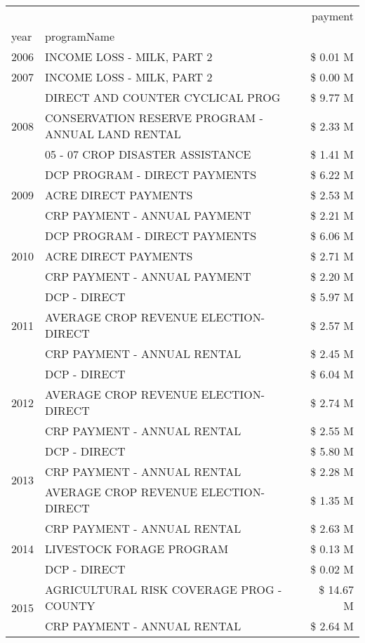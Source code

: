 \begin{tabular}{llr}
\toprule
 &  & payment \\
year & programName &  \\
\midrule
2006 & INCOME LOSS - MILK, PART 2 & \$ 0.01 M \\
\cline{1-3}
2007 & INCOME LOSS - MILK, PART 2 & \$ 0.00 M \\
\cline{1-3}
\multirow[t]{3}{*}{2008} & DIRECT AND COUNTER CYCLICAL PROG & \$ 9.77 M \\
 & CONSERVATION RESERVE PROGRAM - ANNUAL LAND RENTAL & \$ 2.33 M \\
 & 05 - 07 CROP DISASTER ASSISTANCE & \$ 1.41 M \\
\cline{1-3}
\multirow[t]{3}{*}{2009} & DCP PROGRAM - DIRECT PAYMENTS & \$ 6.22 M \\
 & ACRE DIRECT PAYMENTS & \$ 2.53 M \\
 & CRP PAYMENT - ANNUAL PAYMENT & \$ 2.21 M \\
\cline{1-3}
\multirow[t]{3}{*}{2010} & DCP PROGRAM - DIRECT PAYMENTS & \$ 6.06 M \\
 & ACRE DIRECT PAYMENTS & \$ 2.71 M \\
 & CRP PAYMENT - ANNUAL PAYMENT & \$ 2.20 M \\
\cline{1-3}
\multirow[t]{3}{*}{2011} & DCP - DIRECT & \$ 5.97 M \\
 & AVERAGE CROP REVENUE ELECTION-DIRECT & \$ 2.57 M \\
 & CRP PAYMENT - ANNUAL RENTAL & \$ 2.45 M \\
\cline{1-3}
\multirow[t]{3}{*}{2012} & DCP - DIRECT & \$ 6.04 M \\
 & AVERAGE CROP REVENUE ELECTION-DIRECT & \$ 2.74 M \\
 & CRP PAYMENT - ANNUAL RENTAL & \$ 2.55 M \\
\cline{1-3}
\multirow[t]{3}{*}{2013} & DCP - DIRECT & \$ 5.80 M \\
 & CRP PAYMENT - ANNUAL RENTAL & \$ 2.28 M \\
 & AVERAGE CROP REVENUE ELECTION-DIRECT & \$ 1.35 M \\
\cline{1-3}
\multirow[t]{3}{*}{2014} & CRP PAYMENT - ANNUAL RENTAL & \$ 2.63 M \\
 & LIVESTOCK FORAGE PROGRAM & \$ 0.13 M \\
 & DCP - DIRECT & \$ 0.02 M \\
\cline{1-3}
\multirow[t]{3}{*}{2015} & AGRICULTURAL RISK COVERAGE PROG - COUNTY & \$ 14.67 M \\
 & CRP PAYMENT - ANNUAL RENTAL & \$ 2.64 M \\

\end{tabular}
